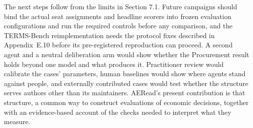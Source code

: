 The next steps follow from the limits in Section 7.1. Future campaigns should bind
the actual seat assignments and headline scorers into frozen evaluation
configurations and run the required controls before any comparison, and the
TERMS-Bench reimplementation needs the protocol fixes described in
Appendix~E.10 before its pre-registered reproduction can proceed. A second agent and a neutral deliberation arm
would show whether the Procurement result holds beyond one model and what produces it. Practitioner review would
calibrate the cases' parameters, human baselines would show where agents
stand against people, and externally contributed cases would test whether
the structure serves authors other than its maintainers. AERead's present
contribution is that structure, a common way to construct evaluations of
economic decisions, together with an evidence-based account of the checks
needed to interpret what they measure.
